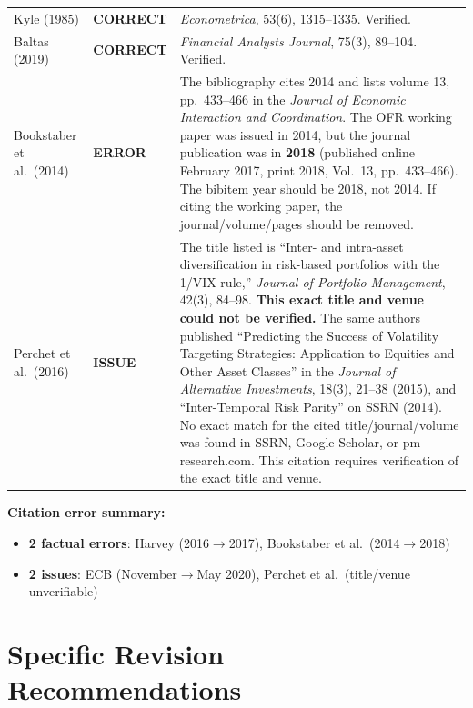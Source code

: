 \documentclass[12pt,a4paper]{article}
\begin{document}
\begin{longtable}{p{3.8cm}p{2.2cm}p{6.5cm}}
Kyle (1985) &
\textcolor{lowgreen}{\textbf{CORRECT}} &
\emph{Econometrica}, 53(6), 1315--1335. Verified. \\[0.5em]

Baltas (2019) &
\textcolor{lowgreen}{\textbf{CORRECT}} &
\emph{Financial Analysts Journal}, 75(3), 89--104. Verified. \\[0.5em]

Bookstaber et al.\ (2014) &
\textcolor{highred}{\textbf{ERROR}} &
The bibliography cites 2014 and lists volume 13, pp.\ 433--466 in the \emph{Journal of Economic Interaction and Coordination}. The OFR working paper was issued in 2014, but the journal publication was in \textbf{2018} (published online February 2017, print 2018, Vol.~13, pp.~433--466). The bibitem year should be 2018, not 2014. If citing the working paper, the journal/volume/pages should be removed. \\[0.5em]

Perchet et al.\ (2016) &
\textcolor{medorange}{\textbf{ISSUE}} &
The title listed is ``Inter- and intra-asset diversification in risk-based portfolios with the 1/VIX rule,'' \emph{Journal of Portfolio Management}, 42(3), 84--98. \textbf{This exact title and venue could not be verified.} The same authors published ``Predicting the Success of Volatility Targeting Strategies: Application to Equities and Other Asset Classes'' in the \emph{Journal of Alternative Investments}, 18(3), 21--38 (2015), and ``Inter-Temporal Risk Parity'' on SSRN (2014). No exact match for the cited title/journal/volume was found in SSRN, Google Scholar, or pm-research.com. This citation requires verification of the exact title and venue. \\[0.5em]

\bottomrule
\end{longtable}

\medskip

\noindent\textbf{Citation error summary:}
\begin{itemize}
  \item \textcolor{highred}{\textbf{2 factual errors}}: Harvey (2016$\to$2017), Bookstaber et al.\ (2014$\to$2018)
  \item \textcolor{medorange}{\textbf{2 issues}}: ECB (November$\to$May 2020), Perchet et al.\ (title/venue unverifiable)
\end{itemize}

\section{Specific Revision Recommendations}
\label{sec:recommendations}
\end{document}
